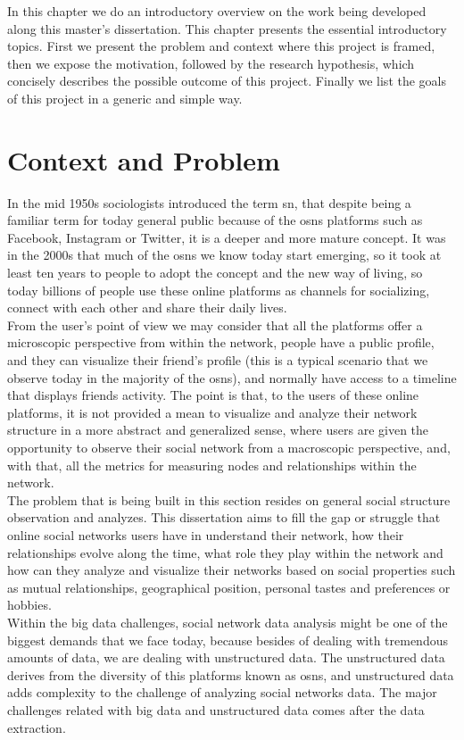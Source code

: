In this chapter we do an introductory overview on the work being developed along this master's dissertation. This chapter presents the essential introductory topics. First we present the problem and context where this project is framed, then we expose the motivation, followed by the research hypothesis, which concisely describes the possible outcome of this project. Finally we list the goals of this project in a generic and simple way.

\section{Context and Problem}

In the mid 1950s sociologists introduced the term \acrfull{sn}, that despite being a familiar term for today general public because of the \glspl{osn} platforms such as Facebook, Instagram or Twitter, it is a deeper and more mature concept. It was in the 2000s that much of the \glspl{osn} we know today start emerging, so it took at least ten years to people to adopt the concept and the new way of living, so today billions of people use these online platforms as channels for socializing, connect with each other and share their daily lives.\\
\indent From the user's point of view we may consider that all the platforms offer a microscopic perspective from within the network, people have a public profile, and they can visualize their friend's profile (this is a typical scenario that we observe today in the majority of the \glspl{osn}), and normally have access to a timeline that displays friends activity. The point is that, to the users of these online platforms, it is not provided a mean to visualize and analyze their network structure in a more abstract and generalized sense, where users are given the opportunity to observe their social network from a macroscopic perspective, and, with that, all the metrics for measuring nodes and relationships within the network.\\
\indent The problem that is being built in this section resides on general social structure observation and analyzes. This dissertation aims to fill the gap or struggle that online social networks users have in understand their network, how their relationships evolve along the time, what role they play within the network and how can they analyze and visualize their networks based on social properties such as mutual relationships, geographical position, personal tastes and preferences or hobbies.\\
\indent Within the big data challenges, social network data analysis might be one of the biggest demands that we face today, because besides of dealing with tremendous amounts of data, we are dealing with unstructured data. The unstructured data derives from the diversity of this platforms known as \glspl{osn}, and unstructured data adds complexity to the challenge of analyzing social networks data. The major challenges related with big data and unstructured data comes after the data extraction.

